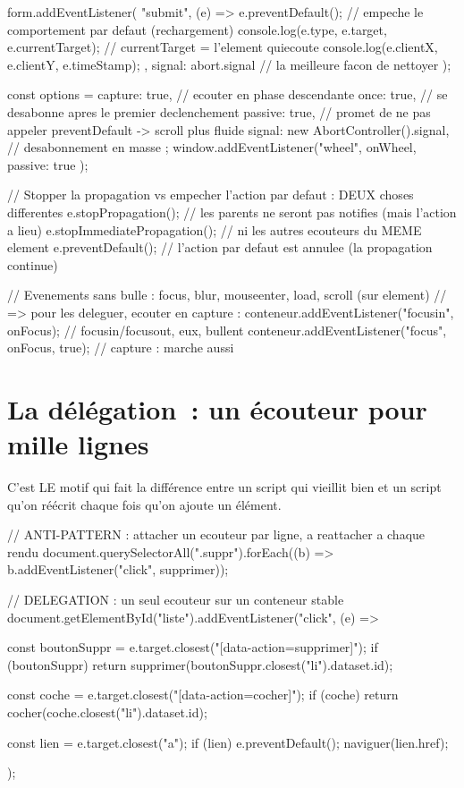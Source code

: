 \documentclass[12pt,a4paper,twoside,openright]{book}
\begin{document}
\begin{codejs}
form.addEventListener(
  "submit",
  (e) => {
    e.preventDefault();                  // empeche le comportement par defaut (rechargement)
    console.log(e.type, e.target, e.currentTarget);   // currentTarget = l'element quiecoute
    console.log(e.clientX, e.clientY, e.timeStamp);
  },
  { signal: abort.signal }               // la meilleure facon de nettoyer
);

const options = {
  capture: true,        // ecouter en phase descendante
  once: true,           // se desabonne apres le premier declenchement
  passive: true,        // promet de ne pas appeler preventDefault -> scroll plus fluide
  signal: new AbortController().signal,   // desabonnement en masse
};
window.addEventListener("wheel", onWheel, { passive: true });

// Stopper la propagation vs empecher l'action par defaut : DEUX choses differentes
e.stopPropagation();        // les parents ne seront pas notifies (mais l'action a lieu)
e.stopImmediatePropagation(); // ni les autres ecouteurs du MEME element
e.preventDefault();         // l'action par defaut est annulee (la propagation continue)

// Evenements sans bulle : focus, blur, mouseenter, load, scroll (sur element)
// => pour les deleguer, ecouter en capture :
conteneur.addEventListener("focusin", onFocus);      // focusin/focusout, eux, bullent
conteneur.addEventListener("focus", onFocus, true);  // capture : marche aussi
\end{codejs}

\section{La d\'el\'egation~: un \'ecouteur pour mille lignes}

C'est LE motif qui fait la diff\'erence entre un script qui vieillit bien et un script
qu'on r\'e\'ecrit chaque fois qu'on ajoute un \'el\'ement.

\begin{codejs}
// ANTI-PATTERN : attacher un ecouteur par ligne, a reattacher a chaque rendu
document.querySelectorAll(".suppr").forEach((b) => b.addEventListener("click", supprimer));

// DELEGATION : un seul ecouteur sur un conteneur stable
document.getElementById("liste").addEventListener("click", (e) => {
  const boutonSuppr = e.target.closest("[data-action=supprimer]");
  if (boutonSuppr) return supprimer(boutonSuppr.closest("li").dataset.id);

  const coche = e.target.closest("[data-action=cocher]");
  if (coche) return cocher(coche.closest("li").dataset.id);

  const lien = e.target.closest("a");
  if (lien) { e.preventDefault(); naviguer(lien.href); }
});
\end{codejs}
\end{document}
